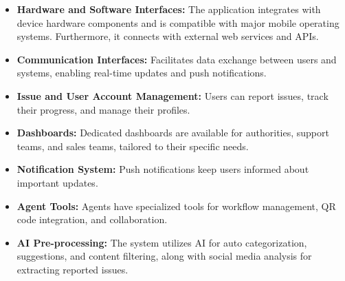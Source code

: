 \begin{itemize}
    \item \textbf{Hardware and Software Interfaces:} The application integrates with device hardware components and is compatible with major mobile operating systems. Furthermore, it connects with external web services and APIs.
    \item \textbf{Communication Interfaces:} Facilitates data exchange between users and systems, enabling real-time updates and push notifications.
    \item \textbf{Issue and User Account Management:} Users can report issues, track their progress, and manage their profiles.
    \item \textbf{Dashboards:} Dedicated dashboards are available for authorities, support teams, and sales teams, tailored to their specific needs.
    \item \textbf{Notification System:} Push notifications keep users informed about important updates.
    \item \textbf{Agent Tools:} Agents have specialized tools for workflow management, QR code integration, and collaboration.
    \item \textbf{AI Pre-processing:} The system utilizes AI for auto categorization, suggestions, and content filtering, along with social media analysis for extracting reported issues.
\end{itemize}